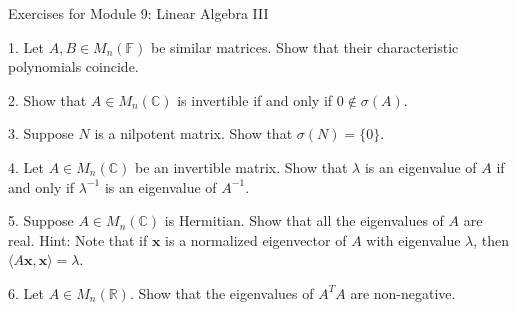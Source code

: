 \documentclass{article}
\theoremstyle{remark} %
\newcommand{\bx}{{\mathbf{x}}}
\newcommand{\innerprod}[1]{\langle #1 \rangle}
\newcommand{\R}{{\mathbb{R}}}
\newcommand{\C}{{\mathbb{C}}}
\newcommand{\F}{{\mathbb{F}}}
\newcommand{\inv}{{-1}}
\begin{document}
\begin{center}
\Large{Exercises for Module 9: Linear Algebra III}
\end{center}


1.  Let $A,B \in M_n(\F)$ be similar matrices. Show that their characteristic polynomials coincide.

\vspace{11cm} %




2. Show that $A\in M_n(\C)$ is invertible if and only if $0 \not \in \sigma(A)$.

\vspace{11cm} %



3. Suppose $N$ is a nilpotent matrix. Show that $\sigma(N) = \{0\}$.

\vspace{12cm} %




4. Let $A\in M_n(\C)$ be an invertible matrix. Show that $\lambda$ is an eigenvalue of $A$ if and only if $\lambda^\inv$ is an eigenvalue of $A^\inv$.
\vspace{11cm} %




5. Suppose $A\in M_n(\C)$ is Hermitian. Show that all the eigenvalues of $A$ are real. Hint: Note that if $\bx$ is a normalized eigenvector of $A$ with eigenvalue $\lambda$, then $\innerprod{A\bx,\bx} = \lambda$.

\vspace{12cm} %




6. Let $A\in M_n(\R)$. Show that the eigenvalues of $A^TA$ are non-negative.
\vspace{11cm} %

\end{document}
